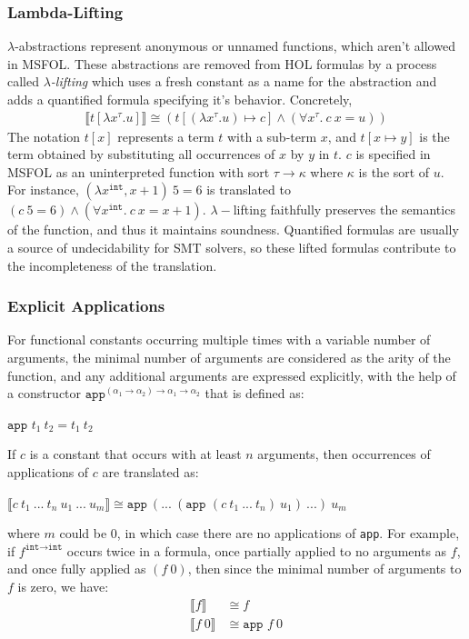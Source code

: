 \documentclass{article}
\begin{document}
	\subsubsection{Lambda-Lifting}
	$\lambda$-abstractions represent 
	anonymous or unnamed functions, 
	which aren't allowed in MSFOL.
	These abstractions are removed
	from HOL formulas by a process 
	called \textit{$\lambda$-lifting}
	which uses a fresh constant as a
	name for the abstraction and adds 
	a quantified formula specifying 
	it's behavior. Concretely,
	\begin{align*}
	\llbracket t[\lambda x^{\tau}.u]
	\rrbracket \cong 
	(t[(\lambda x^{\tau}.u) \mapsto c]
	\land (\forall x^{\tau}.\ c\ x = u))
	\end{align*}
	The notation $t[x]$ represents a 
	term $t$ with a sub-term $x$, 
	and $t[x \mapsto y]$ is the 
	term obtained by substituting all 
	occurrences of $x$ by $y$ in $t$.
	$c$ is specified in MSFOL as an 
	uninterpreted function with sort 
	$\tau \to \kappa$ where $\kappa$ 
	is the sort of $u$. For instance, 
	$(\lambda x^{\texttt{int}}, x + 1)\ 
	5 = 6$
	is translated to $(c\ 5 = 6) \land
	(\forall x^{\texttt{int}}.\ 
	c\ x = x + 1)$. $\lambda-$lifting
	faithfully preserves the 
	semantics of the function, and 
	thus it maintains soundness. 
	Quantified formulas are usually a 
	source of undecidability for SMT 
	solvers, so these lifted formulas 
	contribute to the incompleteness
	of the translation.
	
	\subsubsection{Explicit Applications}
	For functional constants 
	occurring multiple times with 
	a variable number 
	of arguments, the minimal 
	number of arguments are 
	considered as the arity of the 
	function, and any additional 
	arguments are expressed 
	explicitly, with the help of a 
	constructor 
	$\texttt{app}^{(\alpha_1 \to 
		\alpha_2) \to \alpha_1 \to 
		\alpha_2}$ that is defined as:
	\begin{center}
		$\texttt{app }t_1\ t_2 = 
		t_1\ t_2$
	\end{center}
	If $c$ is a constant that 
	occurs with at least $n$
	arguments, then 
	occurrences of applications 
	of $c$ are translated as:
	\begin{center}
		$\llbracket c\ t_1\ ...\ t_n
		\ u_1\ ...\ u_m \rrbracket
		\cong \texttt{app}\ (...\ 
		(\texttt{app }(c\ t_1\ 
		...\ t_n)\ u_1)	\ ...)\ u_m$
	\end{center}
	where $m$ could be $0$, in which 
	case there are no applications 
	of \texttt{app}. For example, if 
	$f^{\texttt{int} \to \texttt{int}}$ 
	occurs twice in a formula, once 
	partially applied to no arguments 
	as $f$, and once fully applied as 
	$(f\ 0)$, then since the minimal 
	number of arguments to $f$ is 
	zero, we have:
	\begin{align*}
	\llbracket f \rrbracket &\cong
	f\\
	\llbracket f\ 0 \rrbracket &\cong
	\texttt{app } f\ 0
	\end{align*}
	
\end{document}

